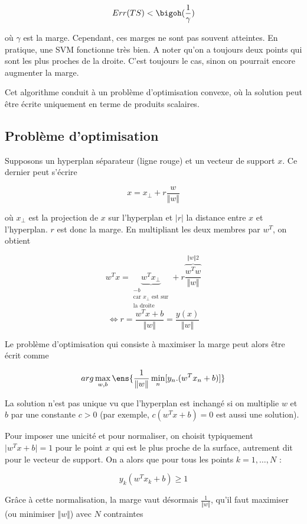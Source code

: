 	$$Err(TS) < \bigoh (\frac{1}{\gamma})$$
	
	où $\gamma$ est la marge. Cependant, ces marges ne sont pas souvent atteintes. En pratique, une SVM fonctionne très bien. A noter qu'on a toujours deux points qui sont les plus proches de la droite. C'est toujours le cas, sinon on pourrait encore augmenter la marge.
	
	Cet algorithme conduit à un problème d'optimisation convexe, où la solution peut être écrite uniquement en terme de produits scalaires.
	
	\subsection{Problème d'optimisation}
	
		
	Supposons un hyperplan séparateur (ligne rouge) et un vecteur de support $x$. Ce dernier peut s'écrire	
	
	$$x = x_{\perp} + r \frac{w}{\Vert w \Vert}$$
	
	où $x_{\perp}$ est la projection de $x$ sur l'hyperplan et $\vert r \vert$ la distance entre $x$ et l'hyperplan. $r$ est donc la marge. En multipliant les deux membres par $w^T$, on obtient
	
	$$w^Tx = \underbrace{w^T x_{\perp}}_{\substack{-b\\ \text{car } x_{\perp} \text{ est sur} \\ \text{la droite}}} + r \frac{\overbrace{w^T w}^{\Vert w \Vert2}}{\Vert w \Vert}$$
	$$\Leftrightarrow r = \frac{w^Tx + b}{\Vert w \Vert} = \frac{y(x)}{\Vert w \Vert}$$
	
	Le problème d'optimisation qui consiste à maximiser la marge peut alors être écrit comme 
	
	$$arg \max_{w, b} \ens{\frac{1}{\Vert w \Vert} \min_{n} [y_n . (w^T x_n + b)]}$$
		
	La solution n'est pas unique vu que l'hyperplan est inchangé si  on multiplie $w$ et $b$ par une constante $c > 0$ (par exemple, $c (w^Tx + b) = 0$ est aussi une solution). 
	
	Pour imposer une unicité et pour normaliser, on choisit typiquement $\vert w^T x + b \vert = 1$ pour le point $x$ qui est le plus proche de la surface, autrement dit pour le vecteur de support. On a alors que pour tous les points $k = 1, \dots , N$ :
	
	$$y_k(w^T x_k + b) \geq 1$$
	
	Grâce à cette normalisation, la marge vaut désormais $\frac{1}{\Vert w \Vert}$, qu'il faut maximiser (ou minimiser $\Vert w \Vert$) avec $N$ contraintes
		
